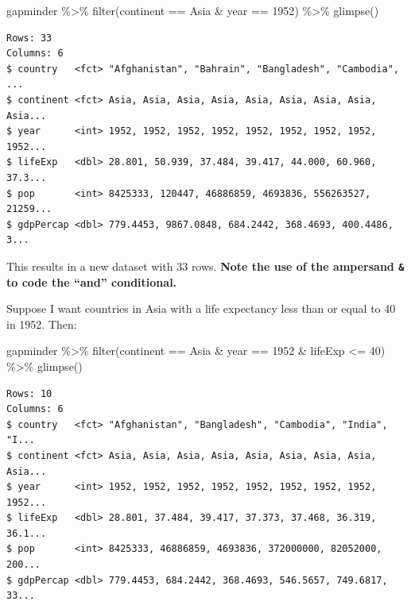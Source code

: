 \documentclass[
]{book}
\makeatletter
\newenvironment{Shaded}{\begin{snugshade}}{\end{snugshade}}
\newcommand{\DecValTok}[1]{\textcolor[rgb]{0.06,0.06,0.06}{#1}}
\newcommand{\FunctionTok}[1]{\textcolor[rgb]{0,0,0}{#1}}
\newcommand{\NormalTok}[1]{#1}
\newcommand{\SpecialCharTok}[1]{\textcolor[rgb]{0,0,0}{#1}}
\newcommand{\StringTok}[1]{\textcolor[rgb]{0.5,0.5,0.5}{#1}}
\newenvironment{kframe}{%
\medskip{}
\setlength{\fboxsep}{.8em}
 \def\at@end@of@kframe{}%
 \ifinner\ifhmode%
  \def\at@end@of@kframe{\end{minipage}}%
  \begin{minipage}{\columnwidth}%
 \fi\fi%
 \def\FrameCommand##1{\hskip\@totalleftmargin \hskip-\fboxsep
 \colorbox{shadecolor}{##1}\hskip-\fboxsep
     \hskip-\linewidth \hskip-\@totalleftmargin \hskip\columnwidth}%
 \MakeFramed {\advance\hsize-\width
   \@totalleftmargin\z@ \linewidth\hsize
   \@setminipage}}%
 {\par\unskip\endMakeFramed%
 \at@end@of@kframe}
\renewenvironment{Shaded}{\begin{kframe}}{\end{kframe}}
\makeatother
\begin{document}
\begin{Shaded}
\begin{Highlighting}[]
\NormalTok{gapminder }\SpecialCharTok{\%\textgreater{}\%} 
  \FunctionTok{filter}\NormalTok{(continent }\SpecialCharTok{==} \StringTok{\textquotesingle{}Asia\textquotesingle{}} \SpecialCharTok{\&}\NormalTok{ year }\SpecialCharTok{==} \DecValTok{1952}\NormalTok{) }\SpecialCharTok{\%\textgreater{}\%} 
  \FunctionTok{glimpse}\NormalTok{()}
\end{Highlighting}
\end{Shaded}

\begin{verbatim}
Rows: 33
Columns: 6
$ country   <fct> "Afghanistan", "Bahrain", "Bangladesh", "Cambodia", ...
$ continent <fct> Asia, Asia, Asia, Asia, Asia, Asia, Asia, Asia, Asia...
$ year      <int> 1952, 1952, 1952, 1952, 1952, 1952, 1952, 1952, 1952...
$ lifeExp   <dbl> 28.801, 50.939, 37.484, 39.417, 44.000, 60.960, 37.3...
$ pop       <int> 8425333, 120447, 46886859, 4693836, 556263527, 21259...
$ gdpPercap <dbl> 779.4453, 9867.0848, 684.2442, 368.4693, 400.4486, 3...
\end{verbatim}

This results in a new dataset with 33 rows. \textbf{Note the use of the ampersand \texttt{\&} to code the ``and'' conditional.}

Suppose I want countries in Asia with a life expectancy less than or equal to 40 in 1952. Then:

\begin{Shaded}
\begin{Highlighting}[]
\NormalTok{gapminder }\SpecialCharTok{\%\textgreater{}\%} 
  \FunctionTok{filter}\NormalTok{(continent }\SpecialCharTok{==} \StringTok{\textquotesingle{}Asia\textquotesingle{}} \SpecialCharTok{\&}\NormalTok{ year }\SpecialCharTok{==} \DecValTok{1952} \SpecialCharTok{\&}\NormalTok{ lifeExp }\SpecialCharTok{\textless{}=} \DecValTok{40}\NormalTok{) }\SpecialCharTok{\%\textgreater{}\%} 
  \FunctionTok{glimpse}\NormalTok{()}
\end{Highlighting}
\end{Shaded}

\begin{verbatim}
Rows: 10
Columns: 6
$ country   <fct> "Afghanistan", "Bangladesh", "Cambodia", "India", "I...
$ continent <fct> Asia, Asia, Asia, Asia, Asia, Asia, Asia, Asia, Asia...
$ year      <int> 1952, 1952, 1952, 1952, 1952, 1952, 1952, 1952, 1952...
$ lifeExp   <dbl> 28.801, 37.484, 39.417, 37.373, 37.468, 36.319, 36.1...
$ pop       <int> 8425333, 46886859, 4693836, 372000000, 82052000, 200...
$ gdpPercap <dbl> 779.4453, 684.2442, 368.4693, 546.5657, 749.6817, 33...
\end{verbatim}
\end{document}
